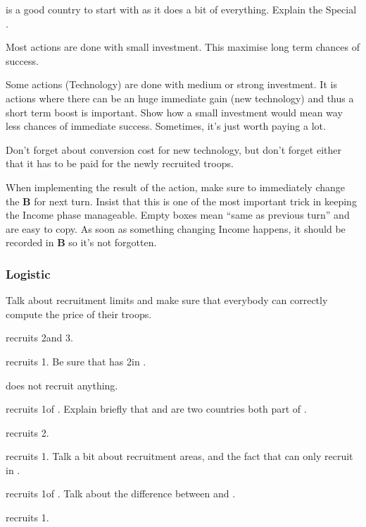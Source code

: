 \aparag \POR is a good country to start with as it does a bit of everything.
\bparag Explain the Special \FTI.

\aparag Most actions are done with small investment.
\bparag This maximise long term chances of success.

\aparag Some actions (Technology) are done with medium or strong investment.
\bparag It is actions where there can be an huge immediate gain (new
technology) and thus a short term boost is important.
\bparag Show how a small investment would mean way less chances of immediate
success.
\bparag Sometimes, it's just worth paying a lot.

\aparag Don't forget about conversion cost for new technology, but don't
forget either that it has to be paid for the newly recruited troops.

\aparag When implementing the result of the action, make sure to immediately
change the \EcoRS \textbf{B} for next turn.
\bparag Insist that this is one of the most important trick in keeping the
Income phase manageable.
\bparag Empty boxes mean ``same as previous turn'' and are easy to copy. As
soon as something changing Income happens, it should be recorded in \EcoRS
\textbf{B} so it's not forgotten.

\subsubsection{Logistic}
\aparag Talk about recruitment limits and make sure that everybody can
correctly compute the price of their troops.

\aparag \ANG recruits 2\ND and 3\LD.

\aparag \FRA recruits 1\ARMY\faceplus.
\bparag Be sure that \FRA has 2\ARMY\faceplus in \provinceProvence.

\aparag \HIS does not recruit anything.

\aparag \POL recruits 1\ARMY\faceplus of .
\bparag Explain briefly that  and 
are two countries both part of \POL.

\aparag \POR recruits 2\ND.

\aparag \RUS recruits 1\ARMY\faceplus.
\bparag Talk a bit about recruitment areas, and the fact that \RUS can only
recruit in \villeMoscou.

\aparag \TUR recruits 1\ARMY\faceplus of \Janissaire.
\bparag Talk about the difference between \Janissaire and \Timar.

\aparag \VEN recruits 1\ARMY\facemoins.

